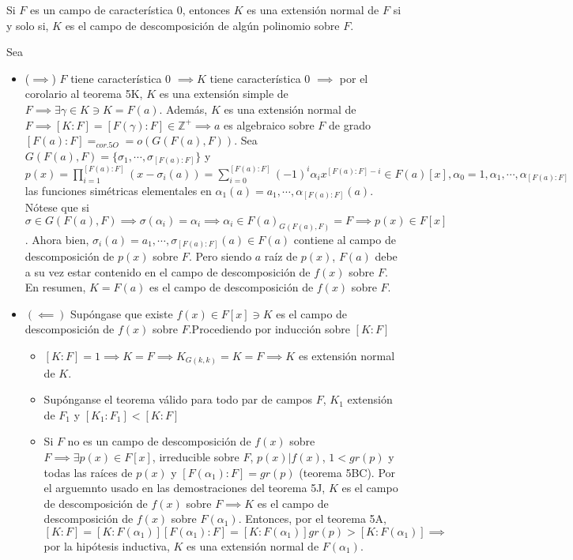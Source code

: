 \begin{teorema}[5P]
    Si $F$ es un campo de característica 0, entonces $K$ es una extensión normal de $F$ si y solo si, $K$ es el campo de descomposición de algún polinomio sobre $F$.
    \begin{dem}
        Sea
        \begin{itemize}
            \item ($\implies$) $F$ tiene característica 0 $\implies K$ tiene característica 0 $\implies$ por el corolario al teorema 5K, $K$ es una extensión simple de $F\implies \exists \gamma \in K\ni K=F(a)$. Además, $K$ es una extensión normal de $F\implies [K:F]=[F(\gamma):F]\in\mathbb{Z}^+\implies a$ es algebraico sobre $F$ de grado $[F(a):F]=_{cor. 5O}=o(G(F(a),F))$. Sea $G(F(a),F)=\{\sigma_1,\cdots,\sigma_[F(a):F]\}$ y $p(x)=\prod_{i=1}^{[F(a):F]}(x-\sigma_i(a))=\sum_{i=0}^{[F(a):F]}(-1)^i \alpha_i x^{[F(a):F]-i}\in F(a)[x], \alpha_0=1,\alpha_1,\cdots,\alpha_{[F(a):F]}$ las funciones simétricas elementales en $\alpha_1(a)=a_1,\cdots,\alpha_{[F(a):F]}(a)$. Nótese que si $\sigma\in G(F(a),F)\implies \sigma(\alpha_i)=\alpha_i\implies \alpha_i\in F(a)_{G(F(a),F)}=F\implies p(x)\in F[x]$. Ahora bien, $\sigma_i(a)=a_1,\cdots, \sigma_{[F(a):F]}(a)\in F(a)$ contiene al campo de descomposición de $p(x)$ sobre $F$. Pero siendo $a$ raíz de $p(x)$, $F(a)$ debe a su vez estar contenido en el campo de descomposición de $f(x)$ sobre $F$. En resumen, $K=F(a)$ es el campo de descomposición de $f(x)$ sobre $F$. 
            \item $(\impliedby)$ Supóngase que existe $f(x)\in F[x]\ni K$ es el campo de descomposición de $f(x)$ sobre $F$.Procediendo por inducción sobre $[K:F]$  
            \begin{itemize}
                \item $[K:F]=1\implies K=F\implies K_{G(k,k)}=K=F\implies K$ es extensión normal de $K$. 
                \item Supónganse el teorema válido para todo par de campos $F$, $K_1$ extensión de $F_1$ y $[K_1:F_1]<[K:F]$
                \item Si $F$ no es un campo de descomposición de $f(x)$ sobre $F\implies \exists p(x)\in F[x]$, irreducible sobre $F$, $p(x)|f(x)$, $1<gr(p)$ y todas las raíces de $p(x)$ y $[F(\alpha_1):F]=gr(p)$ (teorema 5BC). Por el arguemnto usado en las demostraciones del teorema 5J, $K$ es el campo de descomposición de $f(x)$ sobre $F\implies K$ es el campo de descomposición de $f(x)$ sobre $F(\alpha_1)$. Entonces, por el teorema 5A, $[K:F]=[K:F(\alpha_1)][F(\alpha_1):F]=[K:F(\alpha_1)]gr(p)>[K:F(\alpha_1)]\implies$ por la hipótesis inductiva, $K$ es una extensión normal de $F(\alpha_1)$.

\end{itemize}
\end{itemize}
\end{dem}
\end{teorema}
